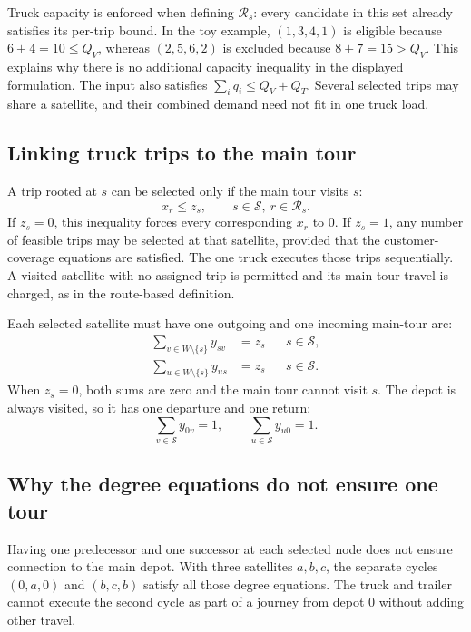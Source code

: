 \documentclass[11pt,a4paper]{article}
\newcommand{\R}{\mathcal R}\newcommand{\C}{\mathcal C}\newcommand{\Sats}{\mathcal S}
\begin{document}
Truck capacity is enforced when defining $\R_s$: every candidate in this set already satisfies its per-trip bound. In the toy example, $(1,3,4,1)$ is eligible because $6+4=10\le Q_V$, whereas $(2,5,6,2)$ is excluded because $8+7=15>Q_V$. This explains why there is no additional capacity inequality in the displayed formulation. The input also satisfies $\sum_iq_i\le Q_V+Q_T$. Several selected trips may share a satellite, and their combined demand need not fit in one truck load.

\subsection{Linking truck trips to the main tour}
A trip rooted at $s$ can be selected only if the main tour visits $s$:
\begin{equation}
x_r\le z_s,
\qquad s\in\Sats,\ r\in\R_s.
\label{eq:active}
\end{equation}
If $z_s=0$, this inequality forces every corresponding $x_r$ to 0. If $z_s=1$, any number of feasible trips may be selected at that satellite, provided that the customer-coverage equations are satisfied. The one truck executes those trips sequentially. A visited satellite with no assigned trip is permitted and its main-tour travel is charged, as in the route-based definition.

Each selected satellite must have one outgoing and one incoming main-tour arc:
\begin{align}
\sum_{v\in W\setminus\{s\}}y_{sv}&=z_s &&s\in\Sats,\label{eq:out}\\
\sum_{u\in W\setminus\{s\}}y_{us}&=z_s &&s\in\Sats.\label{eq:in}
\end{align}
When $z_s=0$, both sums are zero and the main tour cannot visit $s$. The depot is always visited, so it has one departure and one return:
\begin{equation}
\sum_{v\in\Sats}y_{0v}=1,\qquad
\sum_{u\in\Sats}y_{u0}=1.
\label{eq:depot}
\end{equation}

\subsection{Why the degree equations do not ensure one tour}
Having one predecessor and one successor at each selected node does not ensure connection to the main depot. With three satellites $a,b,c$, the separate cycles $(0,a,0)$ and $(b,c,b)$ satisfy all those degree equations. The truck and trailer cannot execute the second cycle as part of a journey from depot 0 without adding other travel.
\end{document}
